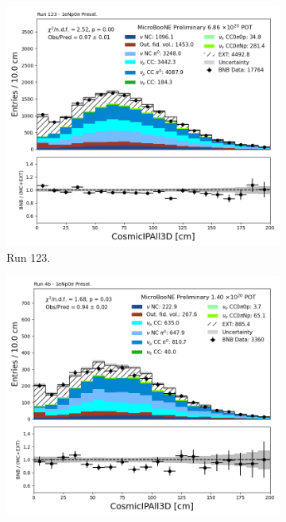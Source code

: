 \begin{figure}[H]
    \centering
    \begin{subfigure}[t]{0.32\linewidth}
        \includegraphics[width=\linewidth]{technote/Appendix_Preselection/Figures/1eNp0pi/Run123/CosmicIPAll3D_Run123_1eNp0pi_Presel.png}
        \caption{Run 123.}
    \end{subfigure}%
    \hspace{0.2cm}%
    \begin{subfigure}[t]{0.32\linewidth}
        \includegraphics[width=\linewidth]{technote/Appendix_Preselection/Figures/1eNp0pi/Run4b/CosmicIPAll3D_Run4b_1eNp0pi_Presel.png}

\end{subfigure}
\end{figure}

